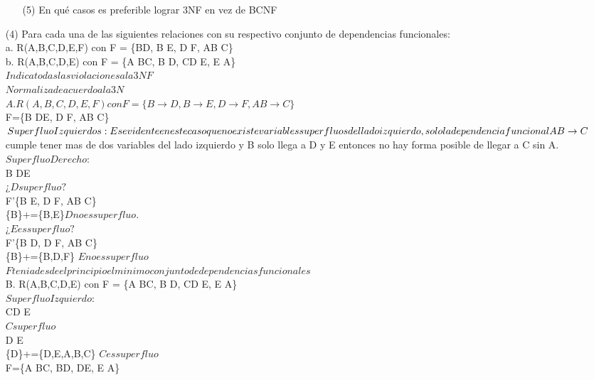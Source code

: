 \documentclass{article}
\begin{document}
\begin{enumerate}
\begin{enumerate}
    \item[(5)] En qué casos es preferible lograr 3NF en vez de BCNF
  \end{enumerate}
\item[(4)] Para cada una de las siguientes relaciones con su respectivo conjunto de dependencias funcionales:\\
a. R(A,B,C,D,E,F) con F = \{B\rightarrow D, B \rightarrow E, D \rightarrow F, AB \rightarrow C\}\\
b. R(A,B,C,D,E) con F = \{A \rightarrow BC, B \rightarrow D, CD \rightarrow E, E \rightarrow A\}\\
$Indica todas las violaciones a la 3NF$\\
$Normaliza de acuerdo a la 3N$\\
$A.  R(A,B,C,D,E,F) con F = \{B \rightarrow D, B \rightarrow E, D \rightarrow F, AB \rightarrow C\}$\\
F=\{B \rightarrow DE, D \rightarrow F, AB \rightarrow C\}\\
$Superfluo Izquierdos:\\
Es evidente en este caso que no existe variables superfluos del lado izquierdo, solo la dependencia funcional AB \rightarrow C$  cumple tener mas de dos variables del lado izquierdo y B solo llega a D y E entonces no hay forma posible de llegar a C sin A.\\
$Superfluo Derecho:$\\
B \rightarrow DE\\
$¿D superfluo?$\\
F'\{B \rightarrow E, D \rightarrow F, AB \rightarrow C\}\\
\{B\}+=\{B,E\}$ D no es superfluo.$\\
$¿E es superfluo?$\\
F'\{B \rightarrow D, D \rightarrow F, AB \rightarrow C\}\\
\{B\}+=\{B,D,F\} $E no es superfluo$\\
$F tenia desde el principio el minimo conjunto de dependencias funcionales$\\
B. R(A,B,C,D,E) con F = \{A \rightarrow BC, B \rightarrow D, CD \rightarrow E, E \rightarrow A\}\\
$Superfluo Izquierdo:$\\
CD \rightarrow E \\
$C superfluo$\\
D \rightarrow E\\
\{D\}+=\{D,E,A,B,C\} $C es superfluo$\\
F=\{A \rightarrow BC, B\rightarrow D, D\rightarrow E, E \rightarrow A\}\\

\end{enumerate}
\end{document}

